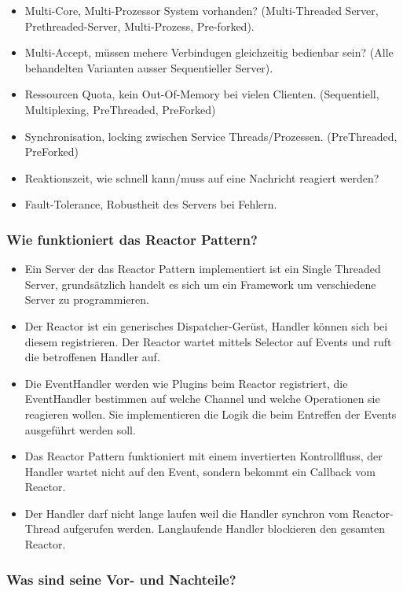 \documentclass[10pt,a4paper]{scrartcl}
\begin{document}
\begin{itemize}
	\item Multi-Core, Multi-Prozessor System vorhanden? (Multi-Threaded Server, Prethreaded-Server,
		Multi-Prozess, Pre-forked).
	\item Multi-Accept, müssen mehere Verbindugen gleichzeitig bedienbar sein? (Alle behandelten
		Varianten ausser Sequentieller Server).
	\item Ressourcen Quota, kein Out-Of-Memory bei vielen Clienten. (Sequentiell, Multiplexing,
		PreThreaded, PreForked)
	\item Synchronisation, locking zwischen Service Threads/Prozessen. (PreThreaded, PreForked)
	\item Reaktionszeit, wie schnell kann/muss auf eine Nachricht reagiert werden?
	\item Fault-Tolerance, Robustheit des Servers bei Fehlern.
\end{itemize}

\subsubsection{Wie funktioniert das Reactor Pattern?}

\begin{itemize}
	\item Ein Server der das Reactor Pattern implementiert ist ein Single Threaded Server,
		grundsätzlich handelt es sich um ein Framework um verschiedene Server zu programmieren.
	\item Der Reactor ist ein generisches Dispatcher-Gerüst, Handler können sich bei diesem
		registrieren. Der Reactor wartet mittels Selector auf Events und ruft die betroffenen Handler
		auf.
	\item Die EventHandler werden wie Plugins beim Reactor registriert, die EventHandler bestimmen auf
		welche Channel und welche Operationen sie reagieren wollen. Sie implementieren die Logik die beim
		Entreffen der Events ausgeführt werden soll.
	\item Das Reactor Pattern funktioniert mit einem invertierten Kontrollfluss, der Handler wartet
		nicht auf den Event, sondern bekommt ein Callback vom Reactor.
	\item Der Handler darf nicht lange laufen weil die Handler synchron vom Reactor-Thread aufgerufen
		werden. Langlaufende Handler blockieren den gesamten Reactor.
\end{itemize}

\subsubsection{Was sind seine Vor- und Nachteile?}
\end{document}
